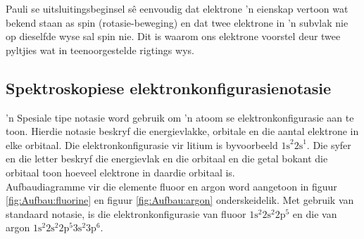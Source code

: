 Pauli se uitsluitingsbeginsel sê eenvoudig dat elektrone 'n eienskap vertoon wat bekend staan as spin (rotasie-beweging) en dat twee elektrone in 'n subvlak nie op dieselfde wyse sal spin nie. Dit is waarom ons elektrone voorstel deur twee pyltjies wat in teenoorgestelde rigtings wys.
\par 


\subsection*{Spektroskopiese elektron\-kon\-fig\-u\-ra\-sie\-no\-ta\-sie}
\label{m38741*id259749}
 'n Spesiale tipe notasie word gebruik om 'n atoom se elektronkonfigurasie aan te toon. Hierdie notasie beskryf die energievlakke, orbitale en die aantal elektrone in elke orbitaal. Die elektronkonfigurasie vir litium is byvoorbeeld ${1\text{s}}^{2}{2\text{s}}^{1}$. Die syfer en die letter beskryf die energievlak en die orbitaal en die getal bokant die orbitaal toon hoeveel elektrone in daardie orbitaal is.\\
Aufbaudiagramme vir die elemente fluoor en argon word aangetoon in figuur \ref{fig:Aufbau:fluorine} en figuur \ref{fig:Aufbau:argon} onderskeidelik. Met gebruik van standaard notasie, is die elektronkonfigurasie van fluoor $1\text{s}^{2}{2}\text{s}^{2}2\text{p}^{5}$ en die van argon $1\text{s}^{2}{2}\text{s}^{2}2\text{p}^{5}{3}\text{s}^{2}3\text{p}^{6}$.\\
